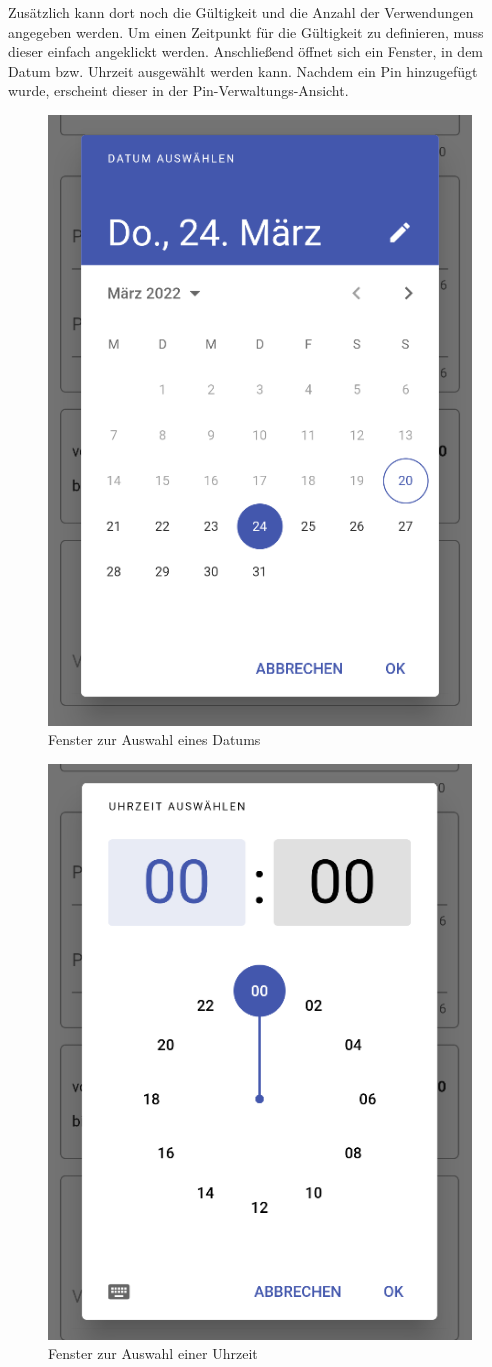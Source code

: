 Zusätzlich kann dort noch die Gültigkeit und die Anzahl der Verwendungen angegeben werden.
Um einen Zeitpunkt für die Gültigkeit zu definieren, muss dieser einfach angeklickt werden.
Anschließend öffnet sich ein Fenster, in dem Datum bzw. Uhrzeit ausgewählt werden kann.
Nachdem ein Pin hinzugefügt wurde, erscheint dieser in der Pin-Verwaltungs-Ansicht.

\begin{figure}[H]
    \begin{center}
        \includegraphics[width=.4\textwidth]{images/mobile/DatePicker.png}
        \caption{Fenster zur Auswahl eines Datums}
    \end{center}
\end{figure}

\begin{figure}[H]
    \begin{center}
        \includegraphics[width=.4\textwidth]{images/mobile/TimePicker.png}
        \caption{Fenster zur Auswahl einer Uhrzeit}
    \end{center}
\end{figure}

